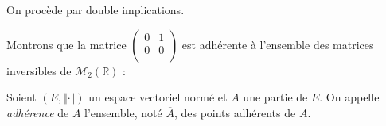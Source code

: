 \documentclass[french,11pt,twoside]{VcCours}
\begin{document}
\begin{Demonstration}{} On procède par double implications.
%
%
%

\vspace*{10cm}
\end{Demonstration}



\begin{Exemple} Montrons que la matrice $\begin{pmatrix}
0 & 1 \\
0 & 0 \\
\end{pmatrix}$ est adhérente à l'ensemble des matrices inversibles de $\mathcal{M}_2(\mathbb{R})$ :

\vspace*{3cm}
%
\end{Exemple}

\begin{Definition}{} Soient $(E, \Vert \cdot \Vert)$ un espace vectoriel normé et $A$ une partie de $E$. On appelle \emph{adhérence} de $A$ l'ensemble, noté $\overline{A}$, des points adhérents de $A$.
\end{Definition}
\end{document}
